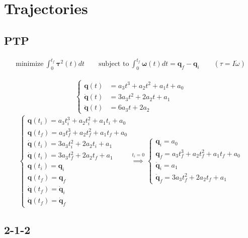 \section{Trajectories}

\subsection{PTP}

\begin{align*}
	\text{minimize} \ \int_0^{t_f} \bm{\tau}^2(t)dt \qquad
	\text{subject to} \ \int_0^{t_f} \bm{\omega}(t)dt = \bm{q}_f - \bm{q}_i
	\qquad
	(\tau = I\dot{\omega})
\end{align*}

\begin{gather*}
\begin{cases}
\bm{q}(t) &= a_3t^3 + a_2t^2 + a_1t + a_0 \\
\bm{\dot{q}}(t) &= 3a_3t^2 + 2a_2t + a_1 \\
\bm{\ddot{q}}(t) &= 6a_3t + 2a_2
\end{cases}
\end{gather*}
\vspace*{7pt}
$$
\begin{cases*}
	\bm{q}(t_i) = a_3t_i^3 + a_2t_i^2 + a_1t_i + a_0 \\
	\bm{q}(t_f) = a_3t_f^3 + a_2t_f^2 + a_1t_f + a_0 \\
	\bm{\dot{q}}(t_i) = 3a_3t_i^2 + 2a_2t_i + a_1 \\
	\bm{\dot{q}}(t_i) = 3a_3t_f^2 + 2a_2t_f + a_1 \\
	\bm{q}(t_i) = \bm{q}_i \\
	\bm{q}(t_f) = \bm{q}_f \\
	\bm{\dot{q}}(t_f) = \bm{\dot{q}}_i \\
	\bm{\dot{q}}(t_f) = \bm{\dot{q}}_f
\end{cases*}
\overset{t_i = 0}{\implies}
\begin{cases*}
	\bm{q}_i = a_0 \\
	\bm{q}_f = a_3t_f^3 + a_2t_f^2 + a_1t_f + a_0 \\
	\bm{\dot{q}}_i = a_1 \\
	\bm{\dot{q}}_f = 3a_3t_f^2 + 2a_2t_f + a_1
\end{cases*}
$$



\subsection{2-1-2}

